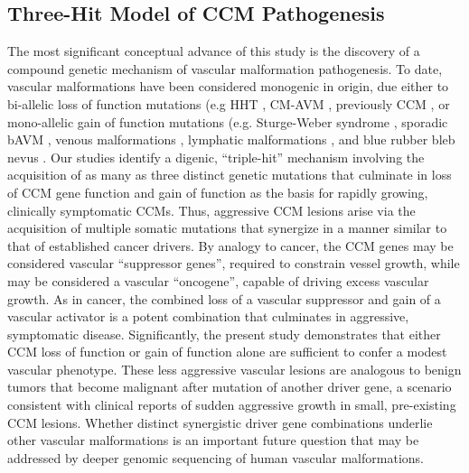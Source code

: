\subsection{Three-Hit Model of CCM Pathogenesis}
The most significant conceptual advance of this study is the discovery of a compound genetic mechanism of vascular malformation pathogenesis. To date, vascular malformations have been considered monogenic in origin, due either to bi-allelic loss of function mutations (e.g HHT \citep{snellings2019}, CM-AVM \citep{lapinski2018}, previously CCM \citep{akers2009, mcdonald2014}, or mono-allelic gain of function mutations (e.g. Sturge-Weber syndrome \citep{shirley2013}, sporadic bAVM \citep{nikolaev2018}, venous malformations \citep{limaye2015}, lymphatic malformations \citep{luks2015}, and blue rubber bleb nevus \citep{soblet2017, tang2017, goss2019, davis2020, francis2019, couto2017, couto2015}. Our studies identify a digenic, “triple-hit” mechanism involving the acquisition of as many as three distinct genetic mutations that culminate in loss of CCM gene function and gain of  function as the basis for rapidly growing, clinically symptomatic CCMs. Thus, aggressive CCM lesions arise via the acquisition of multiple somatic mutations that synergize in a manner similar to that of established cancer drivers. By analogy to cancer, the CCM genes may be considered vascular “suppressor genes”, required to constrain vessel growth, while  may be considered a vascular “oncogene”, capable of driving excess vascular growth. As in cancer, the combined loss of a vascular suppressor and gain of a vascular activator is a potent combination that culminates in aggressive, symptomatic disease. Significantly, the present study demonstrates that either CCM loss of function or  gain of function alone are sufficient to confer a modest vascular phenotype. These less aggressive vascular lesions are analogous to benign tumors that become malignant after mutation of another driver gene, a scenario consistent with clinical reports of sudden aggressive growth in small, pre-existing CCM lesions. Whether distinct synergistic driver gene combinations underlie other vascular malformations is an important future question that may be addressed by deeper genomic sequencing of human vascular malformations. 

